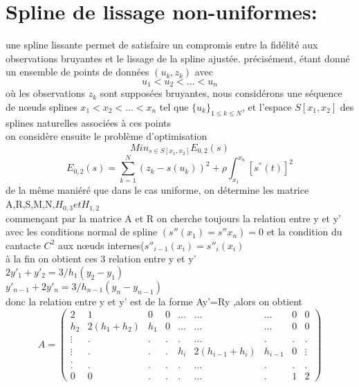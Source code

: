 \documentclass[11pt]{report}
\begin{document}
\begin{center}
\end{center}
\chapter*{Spline de lissage non-uniformes:}
une spline lissante permet de satisfaire un compromis entre la fidélité aux observations bruyantes et le lissage de la spline ajustée. précisément, étant donné un ensemble de points de données $(u_k,z_k)$ avec $$u_{1}<u_{2}< ... <u_{n}$$
où les observations $z_k$ sont supposées bruyantes, nous considérons une séquence de nœuds splines $x_{1}< x_{2}<... < x_{n}$
tel que $\{{u_k}\}_{1 \leq k \leq N}$, et l'espace $S[x_1,x_2]$ des splines naturelles associées à ces points \\
on considère ensuite le problème d'optimisation $$Min_{s \in S[x_1,x_2]}E_{0,2}(s)$$
$$E_{0,2}(s)=\sum_{k=1}^{N}(z_k-s(u_k))^2+\rho\int_{x_1}^{x_n}[s^{''}(t)]^2$$
de la même maniéré que dans le cas uniforme, on détermine les matrice A,R,S,M,N,$H_{0,3} et H_{1,2}$\\
commençant par la matrice A et R on cherche toujours la relation entre y et y' avec les conditions normal de  spline 
$(s''(x_1)=s''x_n)=0$ et la condition du cantacte $C^2$ aux nœuds internes($s''_{i-1}(x_i)=s''_i(x_i)$\\
à la fin on obtient ces 3 relation entre y et y'\\
$2y'_1+y'_2=3/h_1(y_2-y_1)$\\
$y'_{n-1}+2y'_n=3/h_{n-1}(y_n-y_{n-1})$\\
donc la relation entre y et y' est de la forme Ay'=Ry ,alors on obtient \\
$$A=\begin{pmatrix} 2&1&0&0&...&...&...&0&0 \\ h_2&2(h_1+h_2)&h_1&0&...&...&...&0&0 \\ \vdots&.&.&.&.&...&.&.&.\\ \vdots&.&.&.&h_i&2(h_{i-1}+h_i)&h_{i-1}&0&\vdots \\. \\.&.&.&.&.&...&.&.&. \\ 0&0&.&.&.&...&.&1&2 \end{pmatrix}$$\\
\end{document}
